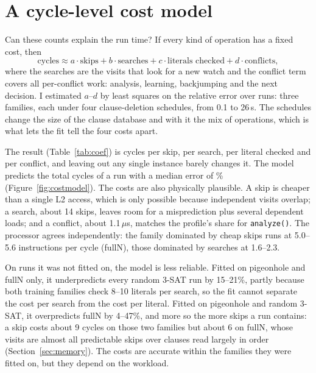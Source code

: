 \section{A cycle-level cost model}
\label{sec:costmodel}

Can these counts explain the run time? If every kind of operation has a fixed
cost, then
\begin{equation}
  \text{cycles} \approx a \cdot \text{skips} + b \cdot \text{searches}
    + c \cdot \text{literals checked} + d \cdot \text{conflicts},
\end{equation}
where the searches are the visits that look for a new watch and the conflict
term covers all per-conflict work: analysis, learning, backjumping and the
next decision. I estimated $a$--$d$ by least squares on the relative error over
\numModelRuns{} runs: three families, each under four clause-deletion
schedules, from 0.1 to 26\,s. The schedules change the size of the clause
database and with it the mix of operations, which is what lets the fit tell
the four costs apart.

The result (Table~\ref{tab:coef}) is \numCoefSkip{} cycles per skip,
\numCoefSearch{} per search, \numCoefScan{} per literal checked and
\numCoefConflict{} per conflict, and leaving out any single instance barely
changes it. The model predicts the total cycles of a run with a median error of
\numModelMedianErr\% (Figure~\ref{fig:costmodel}). The costs are also
physically plausible. A skip is cheaper than a single L2 access, which is only
possible because independent visits overlap; a search, about 14 skips, leaves
room for a misprediction plus several dependent loads; and a conflict, about
1.1\,$\mu$s, matches the profile's share for \texttt{analyze()}. The processor
agrees independently: the family dominated by cheap skips runs at 5.0--5.6
instructions per cycle (fullN), those dominated by searches at 1.6--2.3.

On runs it was not fitted on, the model is less reliable. Fitted on pigeonhole
and fullN only, it underpredicts every random 3-SAT run by 15--21\%, partly
because both training families check 8--10 literals per search, so the fit
cannot separate the cost per search from the cost per literal. Fitted on
pigeonhole and random 3-SAT, it overpredicts fullN by 4--47\%, and more so the
more skips a run contains: a skip costs about 9 cycles on those two families
but about 6 on fullN, whose visits are almost all predictable skips over
clauses read largely in order (Section~\ref{sec:memory}). The costs are
accurate within the families they were fitted on, but they depend on the
workload.

